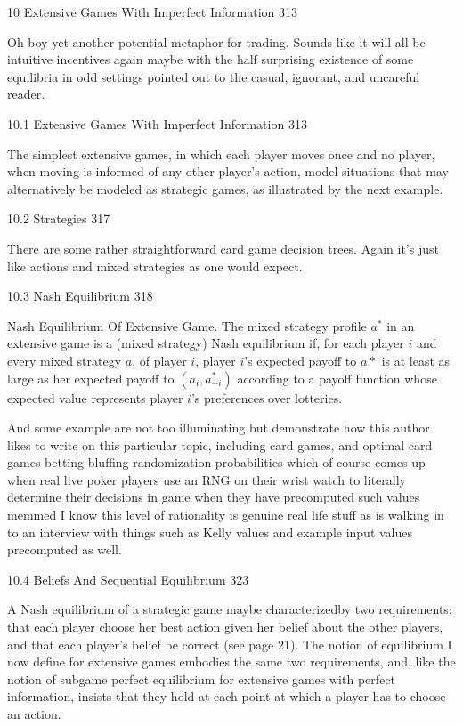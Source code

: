 10 Extensive Games With Imperfect Information 313

Oh boy yet another potential metaphor for trading. Sounds like it will all be intuitive incentives again maybe with the half surprising existence of some equilibria in odd settings pointed out to the casual, ignorant, and uncareful reader.

10.1 Extensive Games With Imperfect Information 313

The simplest extensive games, in which each player moves once and no player, when moving is informed of any other player's action, model situations that may alternatively be modeled as strategic games, as illustrated by the next example.

10.2 Strategies 317

There are some rather straightforward card game decision trees. Again it's just like actions and mixed strategies as one would expect.

10.3 Nash Equilibrium 318

Nash Equilibrium Of Extensive Game. The mixed strategy profile $a^*$ in an extensive game is a (mixed strategy) Nash equilibrium if, for each player $i$ and every mixed strategy $a$, of player $i$, player $i$'s expected payoff to $a*$ is at least as large as her expected payoff to $(a_i,a^*_{-i})$ according to a payoff function whose expected value represents player $i$'s preferences over lotteries.

And some example are not too illuminating but demonstrate how this author likes to write on this particular topic, including card games, and optimal card games betting bluffing randomization probabilities which of course comes up when real live poker players use an RNG on their wrist watch to literally determine their decisions in game when they have precomputed such values memmed I know this level of rationality is genuine real life stuff as is walking in to an interview with things such as Kelly values and example input values precomputed as well.

10.4 Beliefs And Sequential Equilibrium 323

A Nash equilibrium of a strategic game maybe characterizedby two requirements: that each player choose her best action given her belief about the other players, and that each player's belief be correct (see page 21). The notion of equilibrium I now define for extensive games embodies the same two requirements, and, like the notion of subgame perfect equilibrium for extensive games with perfect information, insists that they hold at each point at which a player has to choose an action.

